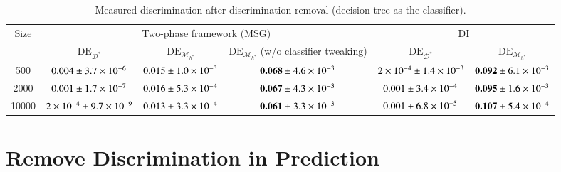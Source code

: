 \documentclass{article}
\begin{document}
\begin{table*}[tbh]\small
\centering
\caption{Measured discrimination after discrimination removal (decision tree as the classifier).}
\label{tab:t2}
\begin{tabular}{|c|c|c|c|c|c|}
\hline
\multirow{2}{*}{Size} & \multicolumn{3}{c|}{Two-phase framework (MSG)}                                                                                        & \multicolumn{2}{c|}{DI}                                               \\ \cline{2-6} 
                      & $\mathrm{DE}_{\mathcal{D}^{*}}$ & $\mathrm{DE}_{\mathcal{M}_{h^{*}}}$ & $\mathrm{DE}_{\mathcal{M}_{h^{*}}}$ (w/o classifier tweaking) & $\mathrm{DE}_{\mathcal{D}^{*}}$ & $\mathrm{DE}_{\mathcal{M}_{h^{*}}}$ \\ \hline
500                   & $\num{0.004} \pm \num{3.7E-6}$ & $\num{0.015} \pm \num{1.0E-3}$     & $\textbf{0.068} \pm \num{4.6E-3}$                                      & $\num{2E-4} \pm \num{1.4E-3}$ & $\textbf{0.092} \pm \num{6.1E-3}$            \\ \hline
2000                  & $\num{0.001} \pm \num{1.7E-7}$ & $\num{0.016} \pm \num{5.3E-4}$     & $\textbf{0.067} \pm \num{4.3E-3}$                                      & $\num{0.001} \pm \num{3.4E-4}$ & $\textbf{0.095} \pm \num{1.6E-3}$            \\ \hline
10000                 & $\num{2E-4} \pm \num{9.7E-9}$ & $\num{0.013} \pm \num{3.3E-4}$     & $\textbf{0.061} \pm \num{3.3E-3}$                                      & $\num{0.001} \pm \num{6.8E-5}$ & $\textbf{0.107} \pm \num{5.4E-4}$            \\ \hline
\end{tabular}
\end{table*}

\section{Remove Discrimination in Prediction}
\end{document}
